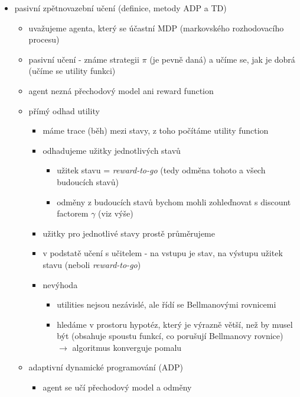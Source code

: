 \begin{itemize}
\begin{itemize}
\begin{itemize}
\begin{itemize}
\begin{itemize}
\end{itemize}
\item poznámka: může se jednoduše stát, že nám parametry $\mu_0,\mu_1$ vyjdou naopak (EM je metoda učení bez učitele, hledá vzory v datech, nezajišťuje jejich intepretaci)
\end{itemize}
\end{itemize}
\end{itemize}
\item pasivní zpětnovazební učení (definice, metody ADP a TD)
\begin{itemize}
\item uvažujeme agenta, který se účastní MDP (markovského rozhodovacího procesu)
\item pasivní učení - známe strategii $\pi$ (je pevně daná) a učíme se, jak je dobrá (učíme se utility funkci)
\item agent nezná přechodový model ani reward function
\item přímý odhad utility
\begin{itemize}
\item máme trace (běh) mezi stavy, z toho počítáme utility function
\item odhadujeme užitky jednotlivých stavů
\begin{itemize}
\item užitek stavu = \textit{reward-to-go} (tedy odměna tohoto a všech budoucích stavů)
\item odměny z budoucích stavů bychom mohli zohleďnovat s discount factorem $\gamma$ (viz výše)
\end{itemize}
\item užitky pro jednotlivé stavy prostě průměrujeme
\item v podstatě učení s učitelem - na vstupu je stav, na výstupu užitek stavu (neboli \textit{reward-to-go})
\item nevýhoda
\begin{itemize}
\item utilities nejsou nezávislé, ale řídí se Bellmanovými rovnicemi
\item hledáme v prostoru hypotéz, který je výrazně větší, než by musel být (obsahuje spoustu funkcí, co porušují Bellmanovy rovnice) $\to$ algoritmus konverguje pomalu
\end{itemize}
\end{itemize}
\item adaptivní dynamické programování (ADP)
\begin{itemize}
\item agent se učí přechodový model a odměny

\end{itemize}
\end{itemize}
\end{itemize}
